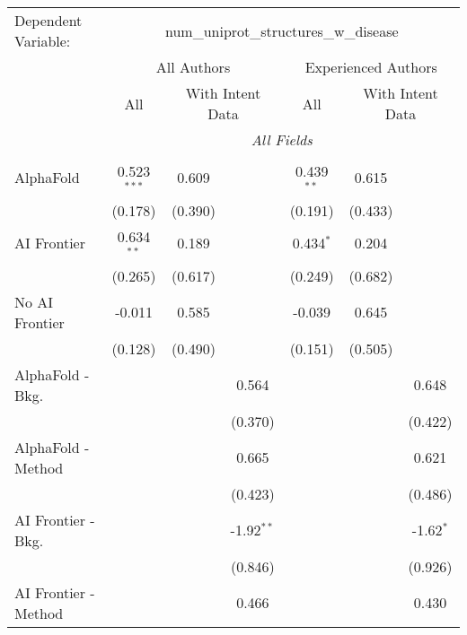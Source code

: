\begingroup
\centering
\begin{tabular}{lcccccc}
   \tabularnewline \midrule \midrule
   Dependent Variable: & \multicolumn{6}{c}{num\_uniprot\_structures\_w\_disease}\\
 & \multicolumn{3}{c}{All Authors} & \multicolumn{3}{c}{Experienced Authors} \\
\cmidrule(lr){2-4} \cmidrule(lr){5-7}
 & \multicolumn{1}{c}{All} & \multicolumn{2}{c}{With Intent Data} & \multicolumn{1}{c}{All} & \multicolumn{2}{c}{With Intent Data} \\
\cmidrule(lr){2-2} \cmidrule(lr){3-4} \cmidrule(lr){5-5} \cmidrule(lr){6-7}
 & \multicolumn{6}{c}{\textit{All Fields}} \\ \\
   AlphaFold               & 0.523$^{***}$ & 0.609   &              & 0.439$^{**}$ & 0.615   &   \\   
                           & (0.178)       & (0.390) &              & (0.191)      & (0.433) &   \\   
   AI Frontier             & 0.634$^{**}$  & 0.189   &              & 0.434$^{*}$  & 0.204   &   \\   
                           & (0.265)       & (0.617) &              & (0.249)      & (0.682) &   \\   
   No AI Frontier          & -0.011        & 0.585   &              & -0.039       & 0.645   &   \\   
                           & (0.128)       & (0.490) &              & (0.151)      & (0.505) &   \\   
   AlphaFold - Bkg.        &               &         & 0.564        &              &         & 0.648\\   
                           &               &         & (0.370)      &              &         & (0.422)\\   
   AlphaFold - Method      &               &         & 0.665        &              &         & 0.621\\   
                           &               &         & (0.423)      &              &         & (0.486)\\   
   AI Frontier - Bkg.      &               &         & -1.92$^{**}$ &              &         & -1.62$^{*}$\\   
                           &               &         & (0.846)      &              &         & (0.926)\\   
   AI Frontier - Method    &               &         & 0.466        &              &         & 0.430\\   

\end{tabular}
